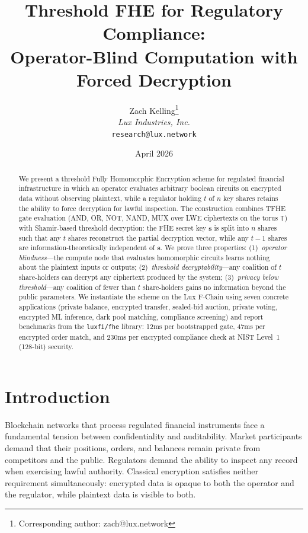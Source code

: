 \documentclass[11pt,a4paper]{article}
\title{Threshold FHE for Regulatory Compliance:\\Operator-Blind Computation with Forced Decryption}
\author{
Zach Kelling\thanks{Corresponding author: zach@lux.network}\\
\textit{Lux Industries, Inc.}\\
\texttt{research@lux.network}
}
\date{April 2026}
\begin{document}
\luxcoverpage

\begin{abstract}
We present a threshold Fully Homomorphic Encryption scheme for regulated
financial infrastructure in which an operator evaluates arbitrary boolean
circuits on encrypted data without observing plaintext, while a regulator
holding $t$ of $n$ key shares retains the ability to force decryption for
lawful inspection.  The construction combines TFHE gate evaluation (AND, OR,
NOT, NAND, MUX over LWE ciphertexts on the torus $\mathbb{T}$) with
Shamir-based threshold decryption: the FHE secret key $\mathbf{s}$ is split
into $n$ shares such that any $t$ shares reconstruct the partial decryption
vector, while any $t-1$ shares are information-theoretically independent
of $\mathbf{s}$.  We prove three properties: (1)~\emph{operator blindness}---the
compute node that evaluates homomorphic circuits learns nothing about the
plaintext inputs or outputs; (2)~\emph{threshold decryptability}---any
coalition of $t$ share-holders can decrypt any ciphertext produced by
the system; (3)~\emph{privacy below threshold}---any coalition of fewer
than $t$ share-holders gains no information beyond the public parameters.
We instantiate the scheme on the Lux F-Chain using seven concrete
applications (private balance, encrypted transfer, sealed-bid auction,
private voting, encrypted ML inference, dark pool matching, compliance
screening) and report benchmarks from the \texttt{luxfi/fhe} library:
12ms per bootstrapped gate, 47ms per encrypted order match, and 230ms
per encrypted compliance check at NIST Level~1 (128-bit) security.
\end{abstract}

\tableofcontents
\newpage

\section{Introduction}
\label{sec:intro}

Blockchain networks that process regulated financial instruments face a
fundamental tension between confidentiality and auditability.  Market
participants demand that their positions, orders, and balances remain
private from competitors and the public.  Regulators demand the ability
to inspect any record when exercising lawful authority.  Classical
encryption satisfies neither requirement simultaneously: encrypted data
is opaque to both the operator and the regulator, while plaintext data
is visible to both.
\end{document}
